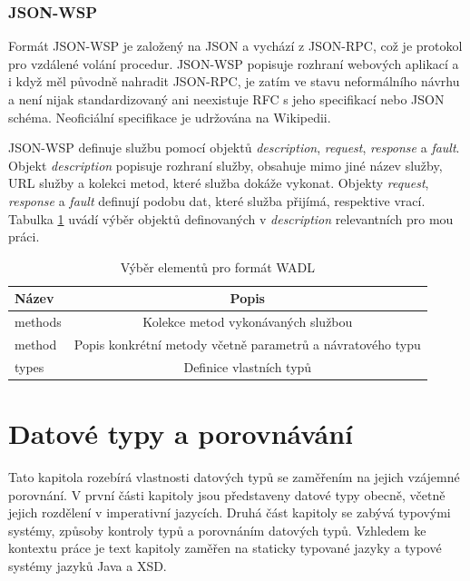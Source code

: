 \documentclass[czech,DP]{thesiskiv}
\begin{document}
\subsection{JSON-WSP}

Formát JSON-WSP je založený na JSON a vychází z JSON-RPC, což je protokol pro vzdálené volání procedur. JSON-WSP popisuje rozhraní webových aplikací a i když měl původně nahradit JSON-RPC, je zatím ve stavu neformálního návrhu a není nijak standardizovaný ani neexistuje RFC s jeho specifikací nebo JSON schéma. Neoficiální specifikace je udržována na Wikipedii\cite{jsonWspSpec}.


JSON-WSP definuje službu pomocí objektů \textit{description}, \textit{request}, \textit{response} a \textit{fault}. Objekt \textit{description} popisuje rozhraní služby, obsahuje mimo jiné název služby, URL služby a kolekci metod, které služba dokáže vykonat. Objekty \textit{request}, \textit{response} a \textit{fault} definují podobu dat, které služba přijímá, respektive vrací. Tabulka \ref{tab:jsonwsp-elements} uvádí výběr objektů definovaných v \textit{description} relevantních pro mou práci.

\begin{table}[h]
	\centering
	\begin{tabular}{|l|c|}
		\hline
		Název & Popis \\
		\hline
		\hline
		methods & Kolekce metod vykonávaných službou \\
		\hline
		method & Popis konkrétní metody včetně parametrů a návratového typu \\
		\hline
		types & Definice vlastních typů \\
		\hline
	\end{tabular}
	\caption{Výběr elementů pro formát WADL}
	\label{tab:jsonwsp-elements} 
\end{table}
 
 
\chapter{Datové typy a porovnávání}

Tato kapitola rozebírá vlastnosti datových typů se zaměřením na jejich vzájemné porovnání. V první části kapitoly jsou představeny datové typy obecně, včetně jejich rozdělení v imperativní jazycích. Druhá část kapitoly se zabývá typovými systémy, způsoby kontroly typů a porovnáním datových typů. Vzhledem ke kontextu práce je text kapitoly zaměřen na staticky typované jazyky a typové systémy jazyků Java a XSD.
\end{document}
